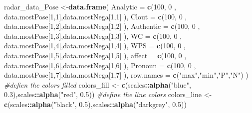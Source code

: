 \documentclass[
]{article}
\newenvironment{Shaded}{\begin{snugshade}}{\end{snugshade}}
\newcommand{\CommentTok}[1]{\textcolor[rgb]{0.56,0.35,0.01}{\textit{#1}}}
\newcommand{\DataTypeTok}[1]{\textcolor[rgb]{0.13,0.29,0.53}{#1}}
\newcommand{\DecValTok}[1]{\textcolor[rgb]{0.00,0.00,0.81}{#1}}
\newcommand{\FloatTok}[1]{\textcolor[rgb]{0.00,0.00,0.81}{#1}}
\newcommand{\KeywordTok}[1]{\textcolor[rgb]{0.13,0.29,0.53}{\textbf{#1}}}
\newcommand{\NormalTok}[1]{#1}
\newcommand{\OperatorTok}[1]{\textcolor[rgb]{0.81,0.36,0.00}{\textbf{#1}}}
\newcommand{\StringTok}[1]{\textcolor[rgb]{0.31,0.60,0.02}{#1}}
\begin{document}
\begin{Shaded}
\begin{Highlighting}[]
{{{{{\NormalTok{radar_data_Pose <-}\KeywordTok{data.frame}\NormalTok{( }\DataTypeTok{Analytic =} \KeywordTok{c}\NormalTok{(}\DecValTok{100}\NormalTok{, }\DecValTok{0}\NormalTok{ , data.mostPose[}\DecValTok{1}\NormalTok{,}\DecValTok{1}\NormalTok{],data.mostNega[}\DecValTok{1}\NormalTok{,}\DecValTok{1}\NormalTok{] ),}
                              \DataTypeTok{Clout =} \KeywordTok{c}\NormalTok{(}\DecValTok{100}\NormalTok{, }\DecValTok{0}\NormalTok{ , data.mostPose[}\DecValTok{1}\NormalTok{,}\DecValTok{2}\NormalTok{],data.mostNega[}\DecValTok{1}\NormalTok{,}\DecValTok{2}\NormalTok{]  ),}
                              \DataTypeTok{Authentic =} \KeywordTok{c}\NormalTok{(}\DecValTok{100}\NormalTok{, }\DecValTok{0}\NormalTok{ , data.mostPose[}\DecValTok{1}\NormalTok{,}\DecValTok{3}\NormalTok{],data.mostNega[}\DecValTok{1}\NormalTok{,}\DecValTok{3}\NormalTok{]  ),}
                              \DataTypeTok{WC =} \KeywordTok{c}\NormalTok{(}\DecValTok{100}\NormalTok{, }\DecValTok{0}\NormalTok{ , data.mostPose[}\DecValTok{1}\NormalTok{,}\DecValTok{4}\NormalTok{],data.mostNega[}\DecValTok{1}\NormalTok{,}\DecValTok{4}\NormalTok{]  ),}
                              \DataTypeTok{WPS =} \KeywordTok{c}\NormalTok{(}\DecValTok{100}\NormalTok{, }\DecValTok{0}\NormalTok{ , data.mostPose[}\DecValTok{1}\NormalTok{,}\DecValTok{5}\NormalTok{],data.mostNega[}\DecValTok{1}\NormalTok{,}\DecValTok{5}\NormalTok{]  ),}
                              \DataTypeTok{affect =} \KeywordTok{c}\NormalTok{(}\DecValTok{100}\NormalTok{, }\DecValTok{0}\NormalTok{ , data.mostPose[}\DecValTok{1}\NormalTok{,}\DecValTok{6}\NormalTok{],data.mostNega[}\DecValTok{1}\NormalTok{,}\DecValTok{6}\NormalTok{]  ),}
                              \DataTypeTok{Pronoun =} \KeywordTok{c}\NormalTok{(}\DecValTok{100}\NormalTok{, }\DecValTok{0}\NormalTok{ , data.mostPose[}\DecValTok{1}\NormalTok{,}\DecValTok{7}\NormalTok{],data.mostNega[}\DecValTok{1}\NormalTok{,}\DecValTok{7}\NormalTok{]  ),}
                              \DataTypeTok{row.names =} \KeywordTok{c}\NormalTok{(}\StringTok{"max"}\NormalTok{,}\StringTok{"min"}\NormalTok{,}\StringTok{"P"}\NormalTok{,}\StringTok{"N"}\NormalTok{)}
\NormalTok{                              )}
\CommentTok{#defien the colors filled}
\NormalTok{colors_fill <-}\StringTok{ }\KeywordTok{c}\NormalTok{(scales}\OperatorTok{::}\KeywordTok{alpha}\NormalTok{(}\StringTok{"blue"}\NormalTok{, }\FloatTok{0.3}\NormalTok{),scales}\OperatorTok{::}\KeywordTok{alpha}\NormalTok{(}\StringTok{"red"}\NormalTok{, }\FloatTok{0.5}\NormalTok{))}
\CommentTok{#define the line colors}
\NormalTok{colors_line <-}\StringTok{ }\KeywordTok{c}\NormalTok{(scales}\OperatorTok{::}\KeywordTok{alpha}\NormalTok{(}\StringTok{"black"}\NormalTok{, }\FloatTok{0.5}\NormalTok{),scales}\OperatorTok{::}\KeywordTok{alpha}\NormalTok{(}\StringTok{"darkgrey"}\NormalTok{, }\FloatTok{0.5}\NormalTok{))}
}}}}}
\end{Highlighting}
\end{Shaded}
\end{document}
